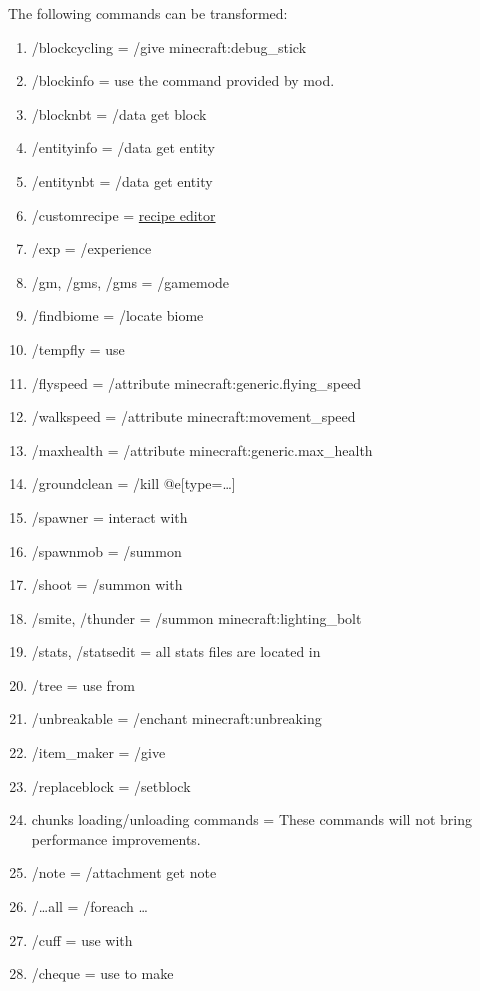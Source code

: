 \label{ch:transformer}
The following commands can be transformed:
\begin{enumerate}
    \item /blockcycling = /give \player minecraft:debug\_stick
    \item /blockinfo = use the command  provided by  mod.
    \item /blocknbt = /data get block
    \item /entityinfo = /data get entity
    \item /entitynbt = /data get entity
    \item /customrecipe = \href{https://crafting.thedestruc7i0n.ca/}{recipe editor}
    \item /exp = /experience
    \item /gm, /gms, /gms = /gamemode
    \item /findbiome = /locate biome
    \item /tempfly = use 
    \item /flyspeed = /attribute \player minecraft:generic.flying\_speed
    \item /walkspeed = /attribute \player minecraft:movement\_speed
    \item /maxhealth = /attribute \player minecraft:generic.max\_health
    \item /groundclean = /kill @e[type=\ldots]
    \item /spawner = interact  with 
    \item /spawnmob = /summon
    \item /shoot = /summon with 
    \item /smite, /thunder = /summon minecraft:lighting\_bolt
    \item /stats, /statsedit = all stats files are located in 
    \item /tree = use  from 
    \item /unbreakable = /enchant \player minecraft:unbreaking
    \item /item\_maker = /give
    \item /replaceblock = /setblock
    \item chunks loading/unloading commands = These commands will not bring performance improvements.
    \item /note = /attachment get note
    \item /\ldots all = /foreach \ldots
    \item /cuff = use  with 
    \item /cheque = use  to make 
\end{enumerate}

